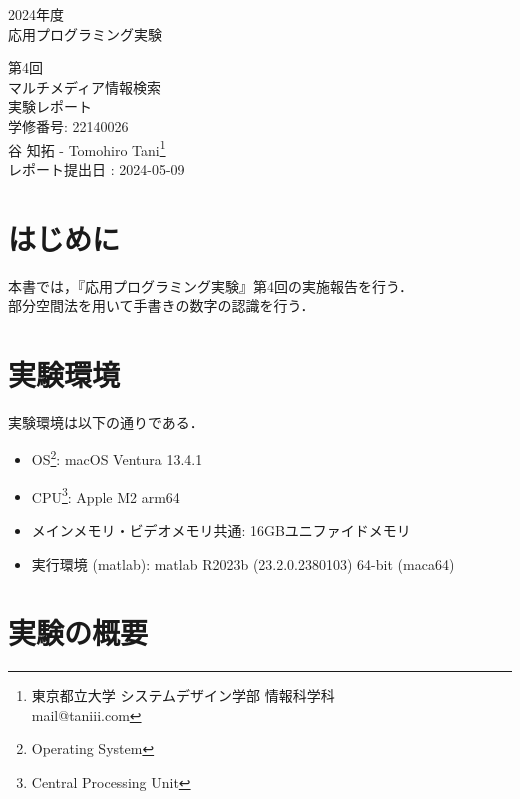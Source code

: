 \documentclass[fleqn, a4paper. 12pt]{jsarticle}
\begin{document}
  \begin{titlepage}
    \begin{center}
      {\Huge 2024年度\\応用プログラミング実験}
      
      \vspace{4cm}
      {\Huge 第4回\\マルチメディア情報検索\\
        実験レポート\\
      }
      \vspace{4cm}
      {\large 学修番号: 22140026\\谷 知拓 - Tomohiro Tani\footnote{東京都立大学 システムデザイン学部 情報科学科 \\ mail@taniii.com} \\}
      \vspace{0.5cm}
      {\large
        レポート提出日 : 2024-05-09 \\
      }
    \end{center}
  \end{titlepage}
  
  \section{はじめに}
    本書では，『応用プログラミング実験』第4回の実施報告を行う．\\
    部分空間法を用いて手書きの数字の認識を行う．\\

  \section{実験環境}

    実験環境は以下の通りである．

    \begin{itemize}
      \item OS\footnote{Operating System}: macOS Ventura 13.4.1
      \item CPU\footnote{Central Processing Unit}: Apple M2 arm64\footnotemark[7]
      \item メインメモリ・ビデオメモリ共通: 16GBユニファイドメモリ\footnotemark[7]
      \item 実行環境 (matlab): matlab R2023b (23.2.0.2380103) 64-bit (maca64)
    \end{itemize}

  \section{実験の概要}
\end{document}
